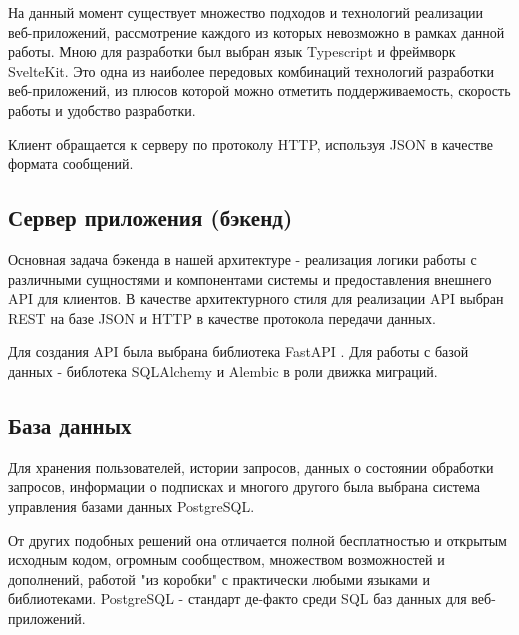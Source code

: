 На данный момент существует множество подходов и технологий реализации веб-приложений, рассмотрение каждого из которых невозможно в рамках данной работы. Мною для разработки был выбран язык Typescript и фреймворк SvelteKit\cite{sveltekit_website}. Это одна из наиболее передовых комбинаций технологий разработки веб-приложений, из плюсов которой можно отметить поддерживаемость, скорость работы и удобство разработки.

Клиент обращается к серверу по протоколу HTTP, используя JSON в качестве формата сообщений.

\subsection{Сервер приложения (бэкенд)}

Основная задача бэкенда в нашей архитектуре - реализация логики работы с различными сущностями и компонентами системы и предоставления внешнего API для клиентов. В качестве архитектурного стиля для реализации API выбран REST\cite{masse2011rest} на базе JSON и HTTP в качестве протокола передачи данных.

Для создания API была выбрана библиотека FastAPI \cite{fastapi_website}. Для работы с базой данных - библотека SQLAlchemy и Alembic в роли движка миграций.

\subsection{База данных}

Для хранения пользователей, истории запросов, данных о состоянии обработки запросов, информации о подписках и многого другого была выбрана система управления базами данных PostgreSQL.

От других подобных решений она отличается полной бесплатностью и открытым исходным кодом, огромным сообществом, множеством возможностей и дополнений, работой "из коробки" с практически любыми языками и библиотеками. PostgreSQL - стандарт де-факто среди SQL баз данных для веб-приложений.